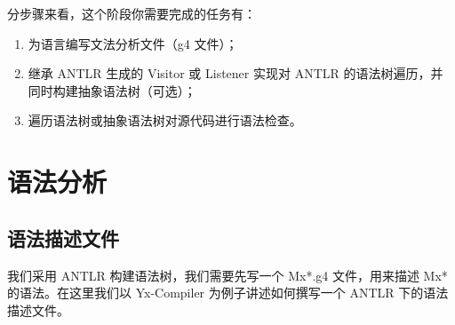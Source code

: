 分步骤来看，这个阶段你需要完成的任务有：
\begin{enumerate}
    \item 为语言编写文法分析文件（g4 文件）；
    \item 继承 ANTLR 生成的 Visitor 或 Listener 实现对 ANTLR 的语法树遍历，并同时构建抽象语法树（可选）；
    \item 遍历语法树或抽象语法树对源代码进行语法检查。
\end{enumerate}





\section{语法分析}
\subsection{语法描述文件}
我们采用 ANTLR 构建语法树，我们需要先写一个 Mx*.g4 文件，用来描述 Mx* 的语法。在这里我们以 Yx-Compiler\cite{Yx}
为例子讲述如何撰写一个 ANTLR 下的语法描述文件。

